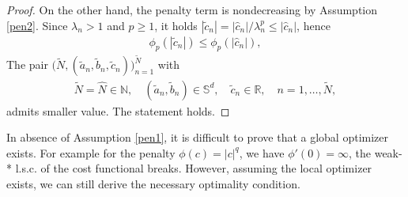 \documentclass[12pt,fleqn]{amsart}
\theoremstyle{definition}
\begin{document}
\begin{proof}
    On the other hand, the penalty term is nondecreasing by Assumption \ref{pen2}. Since $\lambda_n > 1$ and $p \ge 1$, it holds $|\tilde{c}_n| = |\hat{c}_n|/\lambda_n^p \le |\hat{c}_n|$, hence
	\begin{align*}
		\phi_p(|\tilde{c}_n|) \le \phi_p(|\hat{c}_n|),
	\end{align*}
	The pair $\bigg(\tilde{N}, (\tilde{a}_n, \tilde{b}_n, \tilde{c}_n) \bigg)_{n = 1}^{\tilde{N}}$ with
	\begin{align*}
		\tilde{N} = \hat{N} \in \mathbb{N},\quad (\tilde{a}_n,\tilde{b}_n) \in \mathbb{S}^d, \quad \tilde{c}_n \in \mathbb{R}, \quad n = 1, \dots, \tilde{N},
	\end{align*}
	 admits smaller value. The statement holds. 
\end{proof}

In absence of Assumption \ref{pen1}, it is difficult to prove that a global optimizer exists. 
For example for the penalty $ \phi(c) = |c|^q$, we have $\phi'(0) = \infty$, the weak-* l.s.c. of the cost functional breaks.
However, assuming the local optimizer exists, we can still derive the necessary optimality condition. 
\end{document}
